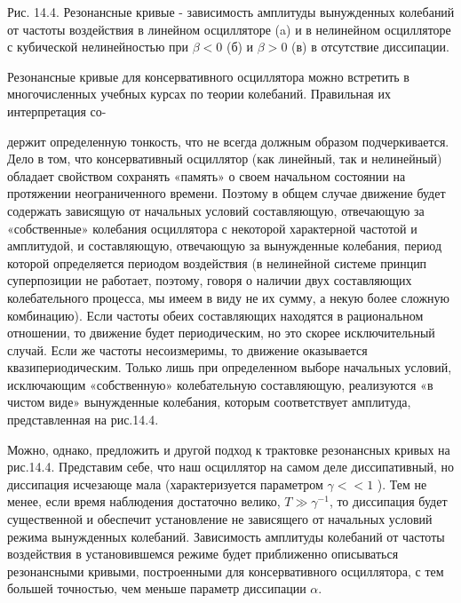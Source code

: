 \documentclass[10pt]{article}
\begin{document}
Рис. 14.4. Резонансные кривые - зависимость амплитуды вынужденных колебаний от частоты воздействия в линейном осцилляторе (a) и в нелинейном осцилляторе с кубической нелинейностью при $\beta<0$ (б) и $\beta>0$ (в) в отсутствие диссипации.

Резонансные кривые для консервативного осциллятора можно встретить в многочисленных учебных курсах по теории колебаний. Правильная их интерпретация со-

держит определенную тонкость, что не всегда должным образом подчеркивается. Дело в том, что консервативный осциллятор (как линейный, так и нелинейный) обладает свойством сохранять «память» о своем начальном состоянии на протяжении неограниченного времени. Поэтому в общем случае движение будет содержать зависящую от начальных условий составляющую, отвечающую за «собственные» колебания осциллятора с некоторой характерной частотой и амплитудой, и составляющую, отвечающую за вынужденные колебания, период которой определяется периодом воздействия (в нелинейной системе принцип суперпозиции не работает, поэтому, говоря о наличии двух составляющих колебательного процесса, мы имеем в виду не их сумму, а некую более сложную комбинацию). Если частоты обеих составляющих находятся в рациональном отношении, то движение будет периодическим, но это скорее исключительный случай. Если же частоты несоизмеримы, то движение оказывается квазипериодическим. Только лишь при определенном выборе начальных условий, исключающим «собственную» колебательную составляющую, реализуются «в чистом виде» вынужденные колебания, которым соответствует амплитуда, представленная на рис.14.4.

Можно, однако, предложить и другой подход к трактовке резонансных кривых на рис.14.4. Представим себе, что наш осциллятор на самом деле диссипативный, но диссипация исчезающе мала (характеризуется параметром $\gamma<<1$ ). Тем не менее, если время наблюдения достаточно велико, $T \gg \gamma^{-1}$, то диссипация будет существенной и обеспечит установление не зависящего от начальных условий режима вынужденных колебаний. Зависимость амплитуды колебаний от частоты воздействия в установившемся режиме будет приближенно описываться резонансными кривыми, построенными для консервативного осциллятора, с тем большей точностью, чем меньше параметр диссипации $\alpha$.
\end{document}

